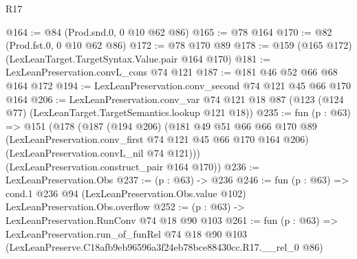\begin{lexlean}{R17}
\begin{coremodule}
@164 := @84 (Prod.snd.{0, 0} @10 @62 @86)
@165 := @78 @164
@170 := @82 (Prod.fst.{0, 0} @10 @62 @86)
@172 := @78 @170 @89
@178 := @159 (@165 @172) (LexLeanTarget.TargetSyntax.Value.pair @164 @170)
@181 := LexLeanPreservation.convL_cons @74 @121
@187 := @181 @46 @52 @66 @68 @164 @172
@194 := LexLeanPreservation.conv_second @74 @121 @45 @66 @170 @164
@206 := LexLeanPreservation.conv_var
    @74
    @121
    @18
    @87
    (@123 (@124 @77) (LexLeanTarget.TargetSemantics.lookup @121 @18))
@235 := fun (p : @63) =>
  @151
    (@178
      (@187
        (@194 @206)
        (@181
          @49
          @51
          @66
          @66
          @170
          @89
          (LexLeanPreservation.conv_first @74 @121 @45 @66 @170 @164 @206)
          (LexLeanPreservation.convL_nil @74 @121)))
      (LexLeanPreservation.construct_pair @164 @170))
@236 := LexLeanPreservation.Obs
@237 := (p : @63) -> @236
@246 := fun (p : @63) =>
  cond.{1} @236 @94 (LexLeanPreservation.Obs.value @102) LexLeanPreservation.Obs.overflow
@252 := (p : @63) -> LexLeanPreservation.RunConv @74 @18 @90 @103
@261 := fun (p : @63) =>
  LexLeanPreservation.run_of_funRel
    @74
    @18
    @90
    @103
    (LexLeanPreserve.C18afb9eb96596a3f24eb78bce88430cc.R17.__rel_0 @86)
\end{coremodule}
\end{lexlean}
